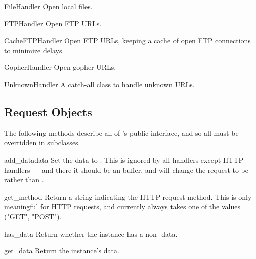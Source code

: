 \begin{classdesc}{FileHandler}{}
Open local files.
\end{classdesc}

\begin{classdesc}{FTPHandler}{}
Open FTP URLs.
\end{classdesc}

\begin{classdesc}{CacheFTPHandler}{}
Open FTP URLs, keeping a cache of open FTP connections to minimize
delays.
\end{classdesc}

\begin{classdesc}{GopherHandler}{}
Open gopher URLs.
\end{classdesc}

\begin{classdesc}{UnknownHandler}{}
A catch-all class to handle unknown URLs.
\end{classdesc}


\subsection{Request Objects \label{request-objects}}

The following methods describe all of 's public interface,
and so all must be overridden in subclasses.

\begin{methoddesc}[Request]{add_data}{data}
Set the  data to .  This is ignored
by all handlers except HTTP handlers --- and there it should be an
 buffer, and will change the
request to be  rather than . 
\end{methoddesc}

\begin{methoddesc}[Request]{get_method}{}
Return a string indicating the HTTP request method.  This is only
meaningful for HTTP requests, and currently always takes one of the
values ("GET", "POST").
\end{methoddesc}

\begin{methoddesc}[Request]{has_data}{}
Return whether the instance has a non- data.
\end{methoddesc}

\begin{methoddesc}[Request]{get_data}{}
Return the instance's data.
\end{methoddesc}


